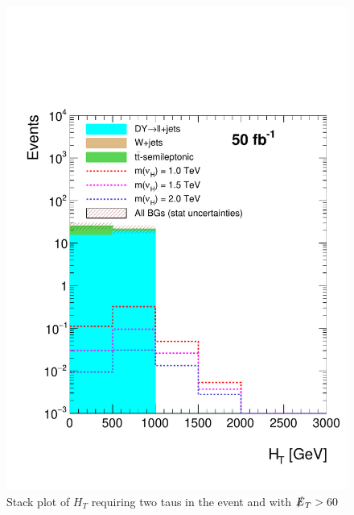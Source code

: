 \begin{figure}
\centering
\includegraphics[width=\linewidth]{StackPlots/HT_2taus_met60_50ifb.pdf}
\caption{Stack plot of $H_{T}$ requiring two taus in the event and with $\slashed{E}_{T} > 60$}
\label{fig: HT2tausMet60}
\end{figure}

